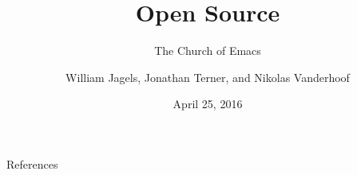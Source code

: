 \documentclass{beamer}
\title{Open Source}
\subtitle{The Church of Emacs}
\author{William Jagels, Jonathan Terner, and Nikolas Vanderhoof}
\institute{Binghamton University}
\date{April 25, 2016}
\begin{document}
\frame{\titlepage}








\begin{frame}[allowframebreaks]{References}
  
  
\end{frame}
\end{document}
